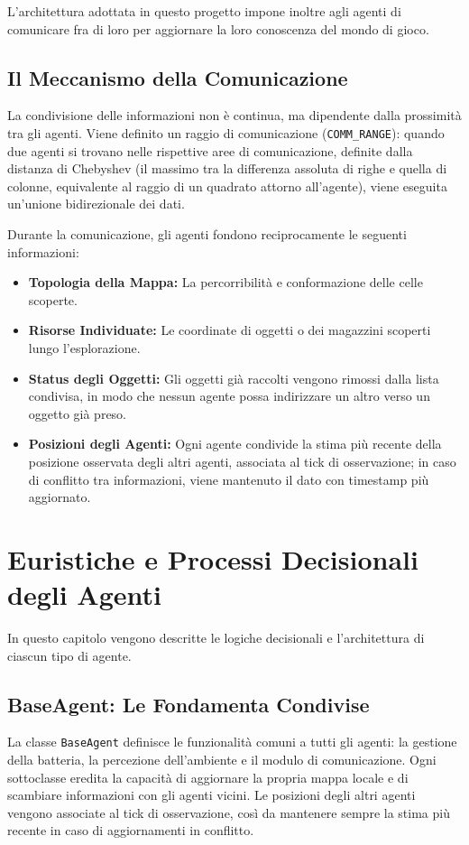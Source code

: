 \documentclass[12pt,a4paper]{report}
\begin{document}
L'architettura adottata in questo progetto impone inoltre agli agenti di comunicare fra di loro per aggiornare la loro conoscenza del mondo di gioco. 

\section{Il Meccanismo della Comunicazione}
La condivisione delle informazioni non è continua, ma dipendente dalla prossimità tra gli agenti. Viene definito un raggio di comunicazione (\texttt{COMM\_RANGE}): quando due agenti si trovano nelle rispettive aree di comunicazione, definite dalla distanza di Chebyshev (il massimo tra la differenza assoluta di righe e quella di colonne, equivalente al raggio di un quadrato attorno all'agente), viene eseguita un'unione bidirezionale dei dati.

Durante la comunicazione, gli agenti fondono reciprocamente le seguenti informazioni:
\begin{itemize}
    \item \textbf{Topologia della Mappa:} La percorribilità e conformazione delle celle scoperte.
    \item \textbf{Risorse Individuate:} Le coordinate di oggetti o dei magazzini scoperti lungo l'esplorazione.
    \item \textbf{Status degli Oggetti:} Gli oggetti già raccolti vengono rimossi dalla lista condivisa, in modo che nessun agente possa indirizzare un altro verso un oggetto già preso.
    \item \textbf{Posizioni degli Agenti:} Ogni agente condivide la stima più recente della posizione osservata degli altri agenti, associata al tick di osservazione; in caso di conflitto tra informazioni, viene mantenuto il dato con timestamp più aggiornato.
\end{itemize}

\chapter{Euristiche e Processi Decisionali degli Agenti}
In questo capitolo vengono descritte le logiche decisionali e l'architettura di ciascun tipo di agente.

\section{BaseAgent: Le Fondamenta Condivise}
La classe \texttt{BaseAgent} definisce le funzionalità comuni a tutti gli agenti: la gestione della batteria, la percezione dell'ambiente e il modulo di comunicazione. Ogni sottoclasse eredita la capacità di aggiornare la propria mappa locale e di scambiare informazioni con gli agenti vicini. Le posizioni degli altri agenti vengono associate al tick di osservazione, così da mantenere sempre la stima più recente in caso di aggiornamenti in conflitto.
\end{document}
